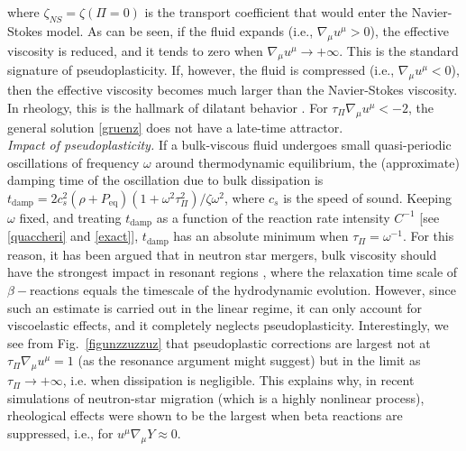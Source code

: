 \documentclass[aps,prl,noshowpacs,noshowkeys,floatfix,superscriptaddress,singlecolum,nofootinbib]{revtex4-2}
\theoremstyle{definition}
\theoremstyle{theorem}
\begin{document}
where $\zeta_{NS}=\zeta(\Pi{=}0)$ is the transport coefficient that would enter the Navier-Stokes model. As can be seen, if the fluid expands (i.e., $\nabla_\mu u^\mu {>}0$), the effective viscosity is reduced, and it tends to zero when $\nabla_\mu u^\mu \rightarrow +\infty$. This is the standard signature of pseudoplasticity. If, however, the fluid is compressed (i.e., $\nabla_\mu u^\mu {<}0$), then the effective viscosity becomes much larger than the Navier-Stokes viscosity. In rheology, this is the hallmark of dilatant behavior \cite{Steffe_book}. For $\tau_\Pi \nabla_\mu u^\mu <-2$, the general solution \eqref{gruenz} does not have a late-time attractor. \\ %

\noindent\textit{Impact of pseudoplasticity.} If a bulk-viscous fluid undergoes small quasi-periodic oscillations of frequency $\omega$ around thermodynamic equilibrium, the (approximate) damping time of the oscillation due to bulk dissipation is \cite{CamelioSimulations2022}
    $t_{\text{damp}} = 2c_s^2 (\rho+P_{\text{eq}})(1+\omega^2 \tau_\Pi^2)/\zeta \omega^2$,
where $c_s$ is the speed of sound. Keeping $\omega$ fixed, and treating $t_{\text{damp}}$ as a function of the reaction rate intensity $C^{-1}$ [see \eqref{quaccheri} and \eqref{exact}],  $t_{\text{damp}}$ has an absolute minimum when $\tau_\Pi=\omega^{-1}$. For this reason, it has been argued that in neutron star mergers, bulk viscosity should have the strongest impact in resonant regions \cite{AlfordRezzolla}, where the relaxation time scale of $\beta-$reactions equals the timescale of the hydrodynamic evolution. However, since such an estimate is carried out in the linear regime, it can only account for viscoelastic effects, and it completely neglects pseudoplasticity. Interestingly, we see from Fig.\  \ref{figunzzuzzuz} that pseudoplastic corrections are largest not at $\tau_\Pi \nabla_\mu u^\mu=1$ (as the resonance argument might suggest) but in the limit as $\tau_\Pi \rightarrow +\infty$, i.e. when dissipation is negligible. This explains why, in recent simulations of neutron-star migration \cite{CamelioSimulations2022} (which is a highly nonlinear process), rheological effects were shown to be the largest when beta reactions are suppressed, i.e., for $u^\mu \nabla_\mu Y \approx 0$.\\
\end{document}
